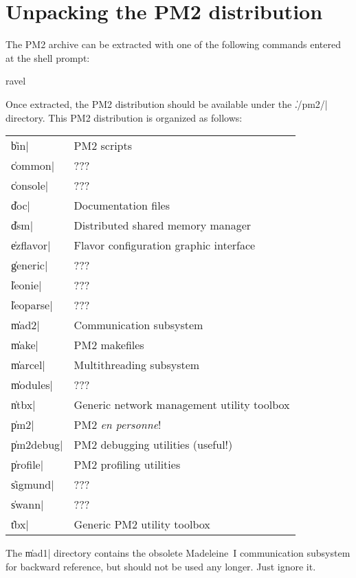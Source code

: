 \section{Unpacking the PM2 distribution}

The PM2 archive can be extracted with one of the following commands
entered at the shell prompt:
\begin{shell}
ravel%
\end{shell}
Once extracted, the PM2 distribution should be available under the
\|./pm2/| directory. This PM2 distribution is organized as follows:
\begin{center}
\begin{tabular}{|l|l|}
\hline 
\|bin| &        PM2 scripts \\
\|common| &     ??? \\
\|console| &    ??? \\
\|doc| &        Documentation files \\
\|dsm| &        Distributed shared memory manager \\
\|ezflavor| &   Flavor configuration graphic interface \\
\|generic| &    ??? \\
\|leonie| &     ??? \\
\|leoparse| &   ??? \\
\|mad2| &       Communication subsystem \\
\|make| &       PM2 makefiles \\
\|marcel| &     Multithreading subsystem \\
\|modules| &    ??? \\
\|ntbx| &       Generic network management utility toolbox \\
\|pm2| &        PM2 \emph{en personne}! \\
\|pm2debug| &   PM2 debugging utilities (useful!) \\
\|profile| &    PM2 profiling utilities \\
\|sigmund| &    ??? \\
\|swann| &      ??? \\
\|tbx| &        Generic PM2 utility toolbox \\
\hline
\end{tabular}
\end{center}
The \|mad1| directory contains the obsolete Madeleine~I communication
subsystem for backward reference, but should not be used any
longer. Just ignore it.

